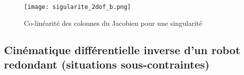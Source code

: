 \begin{figure}[htbp]
	\centering
		\texttt{[image: sigularite\_2dof\_b.png]}
	\caption{Co-linéarité des colonnes du Jacobien pour une singularité}
	\label{fig:sigularite_2dof_b}
\end{figure}


\subsection{Cinématique différentielle inverse d'un robot redondant (situations sous-contraintes)}
\label{sec:invdiffkinredondant}

